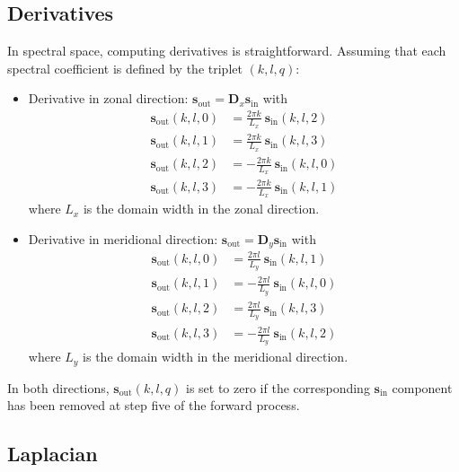 \documentclass[12pt]{scrartcl}
\begin{document}
\subsection{Derivatives}

In spectral space, computing derivatives is straightforward. Assuming that each spectral coefficient is defined by the triplet $(k,l,q)$:
\begin{itemize}
\item Derivative in zonal direction: $\mathbf{s}_\text{out} = \mathbf{D}_x \mathbf{s}_\text{in}$ with
\begin{subequations}
\begin{align}
\mathbf{s}_\text{out}(k,l,0) & = \frac{2 \pi k}{L_x} \ \mathbf{s}_\text{in}(k,l,2) \\
\mathbf{s}_\text{out}(k,l,1) & = \frac{2 \pi k}{L_x} \ \mathbf{s}_\text{in}(k,l,3) \\
\mathbf{s}_\text{out}(k,l,2) & = -\frac{2 \pi k}{L_x} \ \mathbf{s}_\text{in}(k,l,0) \\
\mathbf{s}_\text{out}(k,l,3) & = -\frac{2 \pi k}{L_x} \ \mathbf{s}_\text{in}(k,l,1)
\end{align}
\end{subequations}
where $L_x$ is the domain width in the zonal direction.
\item Derivative in meridional direction: $\mathbf{s}_\text{out} = \mathbf{D}_y \mathbf{s}_\text{in}$ with
\begin{subequations}
\begin{align}
\mathbf{s}_\text{out}(k,l,0) & = \frac{2 \pi l}{L_y} \ \mathbf{s}_\text{in}(k,l,1) \\
\mathbf{s}_\text{out}(k,l,1) & = -\frac{2 \pi l}{L_y} \ \mathbf{s}_\text{in}(k,l,0) \\
\mathbf{s}_\text{out}(k,l,2) & = \frac{2 \pi l}{L_y} \ \mathbf{s}_\text{in}(k,l,3) \\
\mathbf{s}_\text{out}(k,l,3) & = -\frac{2 \pi l}{L_y} \ \mathbf{s}_\text{in}(k,l,2)
\end{align}
\end{subequations}
where $L_y$ is the domain width in the meridional direction.
\end{itemize}
In both directions, $\mathbf{s}_\text{out}(k,l,q)$ is set to zero if the corresponding $\mathbf{s}_\text{in}$ component has been removed at step five of the forward process.

\subsection{Laplacian}
\end{document}

